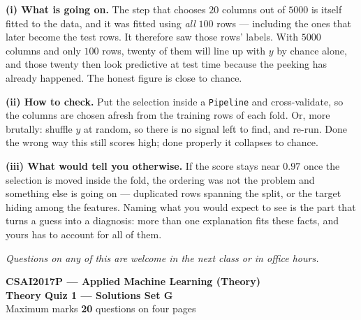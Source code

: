 \documentclass[10pt,a4paper]{article}
\newcommand{\SetLetter}{}
\begin{document}
\vspace{4pt}

\textbf{(i) What is going on.} The step that chooses $20$ columns out of $5000$ is itself fitted to the data, and it was fitted using \emph{all} $100$ rows --- including the ones that later become the test rows. It therefore saw those rows' labels. With $5000$ columns and only $100$ rows, twenty of them will line up with $y$ by chance alone, and those twenty then look predictive at test time because the peeking has already happened. The honest figure is close to chance.\par\vspace{1mm}\textbf{(ii) How to check.} Put the selection inside a \texttt{Pipeline} and cross-validate, so the columns are chosen afresh from the training rows of each fold. Or, more brutally: shuffle $y$ at random, so there is no signal left to find, and re-run. Done the wrong way this still scores high; done properly it collapses to chance.\par\vspace{1mm}\textbf{(iii) What would tell you otherwise.} If the score stays near $0.97$ once the selection is moved inside the fold, the ordering was not the problem and something else is going on --- duplicated rows spanning the split, or the target hiding among the features. Naming what you would expect to see is the part that turns a guess into a diagnosis: more than one explanation fits these facts, and yours has to account for all of them.

\vfill

{\footnotesize\itshape Questions on any of this are welcome in the next class or in office hours.}

\newpage


\renewcommand{\SetLetter}{G}\setcounter{page}{1}

\begin{center}
{\large\bfseries CSAI2017P --- Applied Machine Learning (Theory)}\\[2pt]
{\large\bfseries Theory Quiz 1 --- Solutions \quad\textbullet\quad Set G}\\[3pt]
{\small Maximum marks \textbf{20} \quad\textbullet{} questions on four pages}
\end{center}
\vspace{2pt}

\noindent{}
\vspace{3pt}
\end{document}
